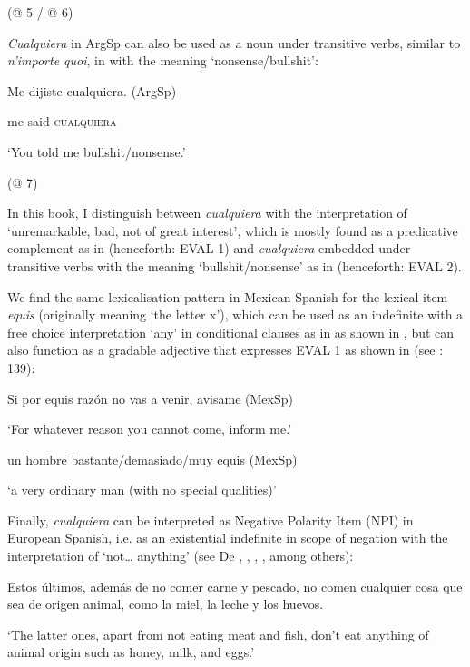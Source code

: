     (@ 5 / @ 6)

\textit{Cualquiera} in ArgSp can also be used as a noun under transitive verbs, similar to \textit{n’importe quoi}, in  with the meaning ‘nonsense/bullshit’:

    Me  dijiste  cualquiera.  (ArgSp)

    me  said  \textsc{cualquiera}   

    ‘You told me bullshit/nonsense.’

    (@ 7)

In this book, I distinguish between \textit{cualquiera} with the interpretation of ‘unremarkable, bad, not of great interest’, which is mostly found as a predicative complement as in  (henceforth: EVAL 1) and \textit{cualquiera} embedded under transitive verbs with the meaning ‘bullshit/nonsense’ as in  (henceforth: EVAL 2).

  We find the same lexicalisation pattern in Mexican Spanish for the lexical item \textit{equis} (originally meaning ‘the letter x’), which can be used as an indefinite with a free choice interpretation ‘any’ in conditional clauses as in  as shown in \citet[137]{Kellert2020a}, but can also function as a gradable adjective that expresses EVAL 1 as shown in  (see \citealt{Kellert2020a}: 139):

    Si por equis razón no vas a venir, avisame  (MexSp)

    ‘For whatever reason you cannot come, inform me.’  

    \citep[137]{Kellert2020a}

    un hombre bastante/demasiado/muy equis  (MexSp)

    ‘a very ordinary man (with no special qualities)’  

    \citep[138]{Kellert2020a}

Finally, \textit{cualquiera} can be interpreted as Negative Polarity Item (NPI) in European Spanish, i.e. as an existential indefinite in scope of negation with the interpretation of ‘not… anything’ (see De \citealt{Bruyne2011}, , \citealt{Arregui2006}, \citealt{Chierchia2006}, among others):

    Estos últimos, además de no comer carne y pescado, no comen cualquier cosa que sea de origen animal, como la miel, la leche y los huevos.

    ‘The latter ones, apart from not eating meat and fish, don’t eat anything of animal origin such as honey, milk, and eggs.’

